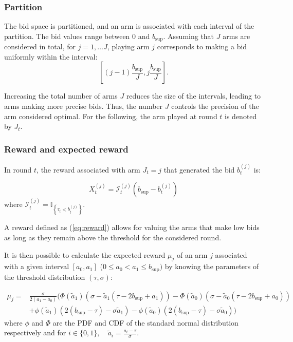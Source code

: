 \documentclass{statsmsc}
\begin{document}
\subsubsection{Partition}
The bid space is partitioned, and an arm is associated with each interval of the partition. 
The bid values range between $0$ and $b_{\sup}$. Assuming that $J$ arms are considered in total, for $j = 1, \dots J$, playing arm $j$ corresponds to making a bid uniformly within the interval:
\[\left[(j-1)\frac{b_{\sup}}{J} , j \frac{b_{\sup}}{J}\right].\]

Increasing the total number of arms $J$ reduces the size of the intervals, leading to arms making more precise bids. Thus, the number 
$J$ controls the precision of the arm considered optimal. For the following, the arm played at round $t$ is denoted by $J_t$.

\subsubsection{Reward and expected reward} 
In round $t$, the reward associated with arm $J_t=j$ that generated the bid $b_t^{(j)}$ is:

\begin{equation}
    X_t^{(j)} = \mathcal{I}_t^{(j)} \left( b_{\sup} - b_t^{(j)}\right)
    \label{eq:reward}
\end{equation}
where $\mathcal{I}_t^{(j)} = \mathbb{I}_{\left\{\tau_t < b_t^{(j)}\right\}}.$

A reward defined as (\ref{eq:reward}) allows for valuing the arms that make low bids as long as they remain above the threshold for the considered round.

It is then possible to calculate the expected reward $\mu_j$ of an arm $j$ associated with a given interval $\left[a_0, a_1 \right]$ ($0\leq a_0 < a_1 \leq b_{\sup})$ by knowing the parameters of the threshold distribution $(\tau, \sigma)$:

\begin{equation}
\begin{aligned}
    \mu_j = &\frac{\sigma}{2(a_1 - a_0)}\biggl( \Phi\left(\tilde{a}_1\right) \left( \sigma - \tilde{a}_1\left(\tau - 2 b_{\sup} + a_1 \right)\right) - \Phi\left(\tilde{a}_0\right) \left( \sigma - \tilde{a}_0 \left(\tau - 2 b_{\sup} + a_0 \right)\right)\\
          &+ \phi\left(\tilde{a}_1\right)\left(  2 ( b_{\sup} - \tau)-\sigma \tilde{a}_1\right) - \phi\left(\tilde{a}_0\right)\left(  2 ( b_{\sup} - \tau)- \sigma \tilde{a}_0\right)\biggr)
  \end{aligned}
  \label{eq:expected_reward}
\end{equation}
  where $\phi$ and $\Phi$ are the PDF and CDF of the standard normal distribution respectively and for $i \in \{0,1\}, \quad \tilde{a}_i = \frac{a_i - \tau}{\sigma}$.
\end{document}
